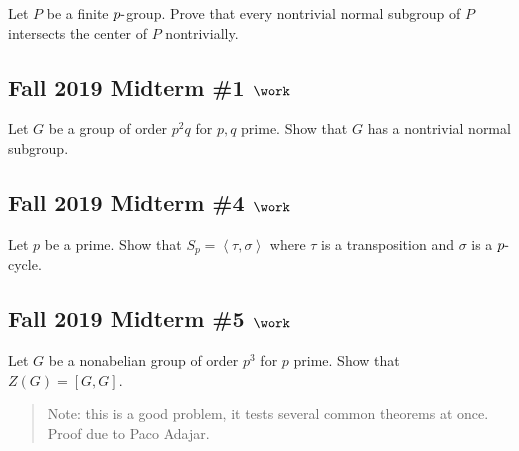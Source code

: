 Let \(P\) be a finite \(p{\hbox{-}}\)group. Prove that every nontrivial
normal subgroup of \(P\) intersects the center of \(P\) nontrivially.

\hypertarget{fall-2019-midterm-1-work}{%
\subsection{\texorpdfstring{Fall 2019 Midterm \#1
\(\work\)}{Fall 2019 Midterm \#1 \textbackslash work}}\label{fall-2019-midterm-1-work}}

Let \(G\) be a group of order \(p^2q\) for \(p, q\) prime. Show that
\(G\) has a nontrivial normal subgroup.

\hypertarget{fall-2019-midterm-4-work}{%
\subsection{\texorpdfstring{Fall 2019 Midterm \#4
\(\work\)}{Fall 2019 Midterm \#4 \textbackslash work}}\label{fall-2019-midterm-4-work}}

Let \(p\) be a prime. Show that
\(S_p = \left\langle{\tau, \sigma}\right\rangle\) where \(\tau\) is a
transposition and \(\sigma\) is a \(p{\hbox{-}}\)cycle.

\hypertarget{fall-2019-midterm-5-work}{%
\subsection{\texorpdfstring{Fall 2019 Midterm \#5
\(\work\)}{Fall 2019 Midterm \#5 \textbackslash work}}\label{fall-2019-midterm-5-work}}

Let \(G\) be a nonabelian group of order \(p^3\) for \(p\) prime. Show
that \(Z(G) = [G, G]\).

\begin{quote}
Note: this is a good problem, it tests several common theorems at once.
Proof due to Paco Adajar.
\end{quote}

